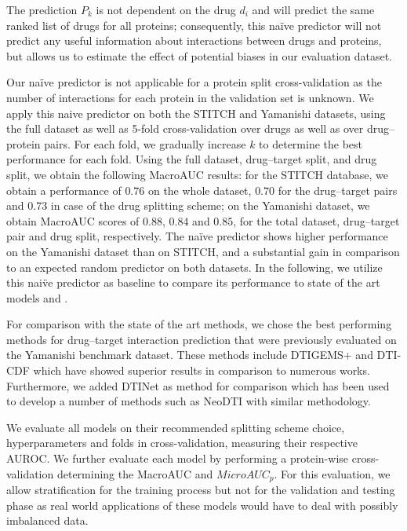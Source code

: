 \documentclass{bioinfo}
\renewcommand{\cite}{\citep}
\begin{document}
The prediction $P_k$ is not dependent on the drug $d_i$ and will
predict the same ranked list of drugs for all proteins; consequently,
this na\"ive predictor will not predict any useful information about
interactions between drugs and proteins, but allows us to estimate the
effect of potential biases in our evaluation dataset.

Our na\"ive predictor is not applicable for a protein split
cross-validation as the number of interactions for each protein in the
validation set is unknown.  We apply this naive predictor on both the
STITCH and Yamanishi datasets, using the full dataset as well as
5-fold cross-validation over drugs as well as over drug--protein
pairs.  For each fold, we gradually increase $k$ to determine the best
performance for each fold. Using the full dataset, drug--target split,
and drug split, we obtain the following MacroAUC results: for the
STITCH database, we obtain a performance of $0.76$ on the whole
dataset, $0.70$ for the drug--target pairs and $0.73$ in case of the
drug splitting scheme; on the Yamanishi dataset, we obtain MacroAUC
scores of $0.88$, $0.84$ and $0.85$, for the total dataset,
drug--target pair and drug split, respectively.  The na\"ive predictor
shows higher performance on the Yamanishi dataset than on STITCH, and
a substantial gain in comparison to an expected random predictor on
both datasets. In the following, we utilize this nai\"ve predictor as
baseline to compare its performance to state of the art models and
\name.

For comparison with the state of the art methods, we chose the best
performing methods for drug--target interaction prediction that were
previously evaluated on the Yamanishi benchmark dataset. These methods
include DTIGEMS+ \cite{DTIGEMS2020} and DTI-CDF \cite{DTI-CDF2019}
which have showed superior results in comparison to numerous
works. Furthermore, we added DTINet \cite{DTINet2017} as method for
comparison which has been used to develop a number of methods such as
NeoDTI \cite{NeoDTI2019} with similar methodology.

We evaluate all models on their recommended splitting scheme choice,
hyperparameters and folds in cross-validation, measuring their
respective AUROC. We further evaluate each model by performing a
protein-wise cross-validation determining the MacroAUC and
$MicroAUC_p$. For this evaluation, we allow stratification for the
training process but not for the validation and testing phase as real
world applications of these models would have to deal with possibly
imbalanced data.
\end{document}
